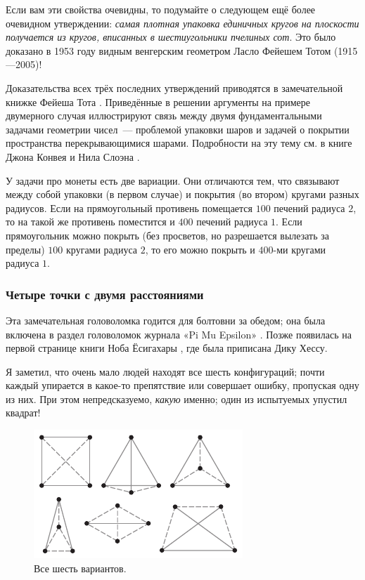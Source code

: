 Если вам эти свойства очевидны, то подумайте о следующем ещё более очевидном утверждении: \emph{самая плотная упаковка единичных кругов на  плоскости получается из кругов, вписанных в шестиугольники пчелиных сот}.
Это было доказано в 1953 году видным венгерским геометром Ласло Фейешем Тотом (1915---2005)!

\begin{addedbytheeditors}
Доказательства всех трёх последних утверждений приводятся в замечательной книжке Фейеша Тота \cite[III §3]{tot}.
Приведённые в решении аргументы на примере двумерного случая иллюстрируют связь между двумя фундаментальными задачами геометрии чисел~--- проблемой упаковки шаров и задачей о покрытии пространства перекрывающимися шарами. Подробности на эту тему см. в книге Джона Конвея и Нила Слоэна \cite{conway-sloane}. 

У задачи про монеты есть две вариации. Они отличаются тем, что связывают между собой упаковки (в первом случае) и покрытия (во втором) кругами разных радиусов. 
Если на прямоугольный противень помещается $100$ печений радиуса $2$, то на такой же противень поместится и $400$ печений радиуса $1$.
Если прямоугольник можно покрыть (без просветов, но разрешается вылезать за пределы) $100$ кругами радиуса $2$, то его можно покрыть и $400$-ми кругами радиуса $1$.
\pr
\end{addedbytheeditors}

\subsubsection*{Четыре точки с двумя расстояниями}

Эта замечательная головоломка годится для болтовни за обедом;
она была включена в раздел головоломок журнала «Pi Mu Epsilon» \cite[1985 год, задача 3a, предложена Ш. Дж. Эйнхорном и И. Дж. Шёнбергом]{16}.
Позже появилась на первой странице книги Ноба Ёсигахары \cite{61}, где была приписана Дику Хессу.

Я заметил, что очень мало людей находят все шесть конфигураций;
почти каждый упирается в какое-то препятствие или совершает ошибку, пропуская одну из них.
При этом непредсказуемо, \emph{какую} именно; один из испытуемых упустил квадрат!

\begin{figure}[ht!]
\centering
\includegraphics[scale=1]{pics/2dist}
\caption{Все шесть вариантов.}
\label{pic:2dist}
\end{figure}

